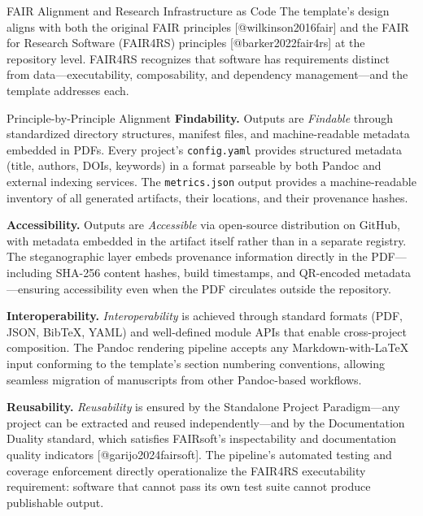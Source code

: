 \documentclass[
  ignorenonframetext,
]{beamer}
\author{\texorpdfstring{}{}}
\date{}
\begin{document}
\begin{frame}[fragile]{FAIR Alignment and Research Infrastructure as
Code}
\protect{}\label{fair-alignment-and-research-infrastructure-as-code}
The template's design aligns with both the original FAIR principles
{[}@wilkinson2016fair{]} and the FAIR for Research Software (FAIR4RS)
principles {[}@barker2022fair4rs{]} at the repository level. FAIR4RS
recognizes that software has requirements distinct from
data---executability, composability, and dependency management---and the
template addresses each.

\begin{block}{Principle-by-Principle Alignment}
\protect{}\label{principle-by-principle-alignment}
\textbf{Findability.} Outputs are \emph{Findable} through standardized
directory structures, manifest files, and machine-readable metadata
embedded in PDFs. Every project's \texttt{config.yaml} provides
structured metadata (title, authors, DOIs, keywords) in a format
parseable by both Pandoc and external indexing services. The
\texttt{metrics.json} output provides a machine-readable inventory of
all generated artifacts, their locations, and their provenance hashes.

\textbf{Accessibility.} Outputs are \emph{Accessible} via open-source
distribution on GitHub, with metadata embedded in the artifact itself
rather than in a separate registry. The steganographic layer embeds
provenance information directly in the PDF---including SHA-256 content
hashes, build timestamps, and QR-encoded metadata---ensuring
accessibility even when the PDF circulates outside the repository.

\textbf{Interoperability.} \emph{Interoperability} is achieved through
standard formats (PDF, JSON, BibTeX, YAML) and well-defined module APIs
that enable cross-project composition. The Pandoc rendering pipeline
accepts any Markdown-with-LaTeX input conforming to the template's
section numbering conventions, allowing seamless migration of
manuscripts from other Pandoc-based workflows.

\textbf{Reusability.} \emph{Reusability} is ensured by the Standalone
Project Paradigm---any project can be extracted and reused
independently---and by the Documentation Duality standard, which
satisfies FAIRsoft's inspectability and documentation quality indicators
{[}@garijo2024fairsoft{]}. The pipeline's automated testing and coverage
enforcement directly operationalize the FAIR4RS executability
requirement: software that cannot pass its own test suite cannot produce
publishable output.
\end{block}


\end{frame}
\end{document}
